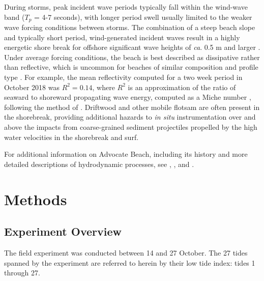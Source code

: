 \documentclass[preprint,12pt,authoryear]{elsarticle}
\begin{document}
During storms, peak incident wave periods typically fall within the wind-wave band ($T_p$ = 4-7 seconds), with longer period swell usually limited to the weaker wave forcing conditions between storms. The combination of a steep beach slope and typically short period, wind-generated incident waves result in a highly energetic shore break for offshore significant wave heights of \textit{ca}. 0.5 m and larger \citep{Hay_etal2014}. Under average forcing conditions, the beach is best described as dissipative rather than reflective, which is uncommon for beaches of similar composition and profile type \citep[e.g.,][]{Wright_etal1979}. For example, the mean reflectivity computed for a two week period in October 2018 was $R^2=0.14$, where $R^2$ is an approximation of the ratio of seaward to shoreward propagating wave energy, computed as a Miche number \citep{Miche1951}, following the method of \citet{Elgar_etal1994}. Driftwood and other mobile flotsam are often present in the shorebreak, providing additional hazards to \textit{in situ} instrumentation over and above the impacts from coarse-grained sediment projectiles propelled by the high water velocities in the shorebreak and surf.

For additional information on Advocate Beach, including its history and more detailed descriptions of hydrodynamic processes, see \citet{Taylor_etal1985}, \citet{Wilson_etal2014}, and \citet{Hay_etal2014}.



\section{Methods}\label{Methods}

\subsection{Experiment Overview}\label{Methods:Experiment}

The field experiment was conducted between 14 and 27 October. The 27 tides spanned by the experiment are referred to herein by their low tide index: tides 1 through 27. %
\end{document}

